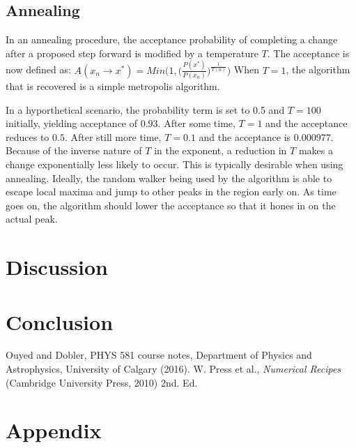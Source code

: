 \documentclass[twocolumn]{article}
\begin{document}
\subsection{Annealing}
In an annealing procedure, the acceptance probability of completing a change after a proposed step forward is modified by a temperature $T$. The acceptance is now defined as:
$A(x_n \to x^*) = Min \Bigg( 1, \Big( \frac{P(x^*)}{P(x_n)}\Big) ^{ \frac{1}{T(n)} } \Bigg)$
When $T=1$, the algorithm that is recovered is a simple metropolis algorithm. 

In a hyporthetical scenario, the probability term is set to 0.5 and $T=100$ initially, yielding acceptance of $0.93$. After some time, $T=1$ and the acceptance reduces to $0.5$. After still more time, $T=0.1$ and the acceptance is $0.000977$. Because of the inverse nature of $T$ in the exponent, a reduction in $T$ makes a change exponentially less likely to occur. This is typically desirable when using annealing. Ideally, the random walker being used by the algorithm is able to escape local maxima and jump to other peaks in the region early on. As time goes on, the algorithm should lower the acceptance so that it hones in on the actual peak.


\section{Discussion}


\section{Conclusion}

\begin{thebibliography}{00}
	Ouyed and Dobler, PHYS 581 course notes, Department of Physics and Astrophysics, University of Calgary (2016).
	W. Press et al., \emph{Numerical Recipes} (Cambridge University Press, 2010) 2nd. Ed.
\end{thebibliography}

\section{Appendix}

	
\end{document}

